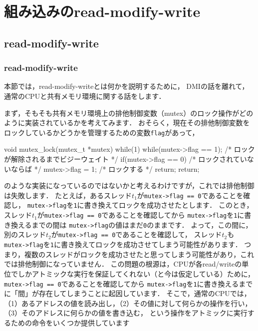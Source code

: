\documentclass[report,12pt]{jsbook}
\begin{document}
\section{組み込みのread-modify-write}

\subsection{read-modify-write}

\subsubsection{read-modify-write}

本節では，read-modify-writeとは何かを説明するために，
DMIの話を離れて，通常のCPUと共有メモリ環境に関する話をします．

まず，そもそも共有メモリ環境上の排他制御変数（mutex）のロック操作がどのように実装されているかを考えてみます．
おそらく，現在その排他制御変数をロックしているかどうかを管理するための変数\texttt{flag}があって，
\begin{code}
void mutex_lock(mutex_t *mutex)
{
  while(1)
    {
      while(mutex->flag == 1);  /* ロックが解除されるまでビジーウェイト */
      if(mutex->flag == 0)  /* ロックされていないならば */
        {
          mutex->flag = 1;  /* ロックする */
          return;
        }
    }
  return;
}
\end{code}
のような実装になっているのではないかと考えるわけですが，これでは排他制御は失敗します．
たとえば，あるスレッド$t_1$が\texttt{mutex->flag == 0}であることを確認し，
\texttt{mutex->flag}を\texttt{1}に書き換えてロックを成功させたとします．
このとき，スレッド$t_1$が\texttt{mutex->flag == 0}であることを確認してから
\texttt{mutex->flag}を\texttt{1}に書き換えるまでの間は
\texttt{mutex->flag}の値はまだ\texttt{0}のままです．
よって，この間に，別のスレッド$t_2$が\texttt{mutex->flag == 0}であることを確認して，
スレッド$t_2$も\texttt{mutex->flag}を\texttt{1}に書き換えてロックを成功させてしまう可能性があります．
つまり，複数のスレッドがロックを成功させたと思ってしまう可能性があり，これでは排他制御になっていません．
この問題の根源は，CPUが各read/writeの単位でしかアトミックな実行を保証してくれない（と今は仮定している）ために，
\texttt{mutex->flag == 0}であることを確認してから
\texttt{mutex->flag}を\texttt{1}に書き換えるまでに「間」が存在してしまうことに起因しています．
そこで，通常のCPUでは，（1）あるアドレスの値を読み出し，（2）その値に対して何らかの操作を行い，（3）そのアドレスに何らかの値を書き込む，
という操作をアトミックに実行するための命令をいくつか提供しています
\end{document}
